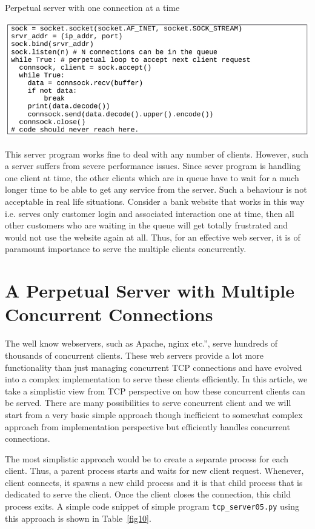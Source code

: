 \begin{table}[H]
\centering
\caption{Perpetual server with one connection at a time}\label{fig09}
\includegraphics[scale=2.92]{src/Figures/chap1/fig09.jpg}
\end{table}

\begin{multicols}{2}
This server program works fine to deal with any number of clients. However, such a server suffers from severe performance issues. Since sever program is handling one client at time, the other clients which are in queue have to wait for a much longer time to be able to get any service from the server. Such a behaviour is not acceptable in real life situations. Consider a bank website that works in this way i.e. serves only customer login and associated interaction one at time, then all other customers who are waiting in the queue will get totally frustrated and would not use the website again at all. Thus, for an effective web server, it is of paramount importance to serve the multiple clients concurrently.

\section{A Perpetual Server with Multiple Concurrent Connections}

The well know webservers, such as Apache, nginx etc.”, serve hundreds of thousands of concurrent clients. These web servers provide a lot more functionality than just managing concurrent TCP connections and have evolved into a complex implementation to serve these clients efficiently. In this article, we take a simplistic view from TCP perspective on how these concurrent clients can be served. There are many possibilities to serve concurrent client and we will start from a very basic simple approach though inefficient to somewhat complex approach from implementation perspective but efficiently handles concurrent connections.

The most simplistic approach would be to create a separate process for each client. Thus, a parent process starts and waits for new client request. Whenever, client connects, it spawns a new child process and it is that child process that is dedicated to serve the client. Once the client closes the connection, this child process exits. A simple code snippet of simple program \texttt{tcp\_server05.py} \cite{art1-key04} using this approach is shown in Table~\ref{fig10}.
\end{multicols}


